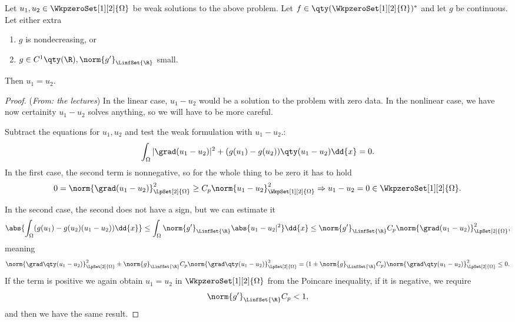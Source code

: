 \begin{example}
\begin{theorem}[Uniqueness]
	Let $u_1, u_2 \in \WkpzeroSet[1][2]{\Omega}$ be weak solutions to the above problem. Let $f \in \qty(\WkpzeroSet[1][2]{\Omega})^{*}$ and let $g$ be continuous. Let either extra 
	\begin{enumerate}
		\item $g$ is nondecreasing, or
		\item $g \in C^1\qty(\R), \norm{g'}_{\LinfSet{\R}}$ small.
	\end{enumerate}
	Then $u_1 = u_2$.
\end{theorem}
\begin{proof}(\textit{From: the lectures})
	In the linear case, $u_1 - u_2$ would be a solution to the problem with zero data. In the nonlinear case, we have now certainity $u_1 - u_2$ solves anything, so we will have to be more careful.
	
Subtract the equations for $u_1, u_2$ and test the weak formulation with $u_1 - u_2.$:
	\[
		\int_{\Omega}|\grad(u_1 - u_2)|^{2} + (g(u_1)-g(u_2))\qty(u_1-u_2)\dd{x} = 0.
	\]
	In the first case, the second term is nonnegative, so for the whole thing to be zero it has to hold 
	\[
		0=\norm{\grad(u_1 - u_2)}_{\LpSet[2]{\Omega}}^{2} \geq C_p \norm{u_1 - u_2}_{\WkpSet[1][2]{\Omega}}^{2} \Rightarrow u_1 - u_2 = 0 \in \WkpzeroSet[1][2]{\Omega}.
	\]

	In the second case, the second does not have a sign, but we can estimate it
	\[
		\abs{\int_{\Omega}(g(u_1)-g(u_2)(u_1-u_2))\dd{x}} \leq \int_{\Omega}\norm{g'}_{\LinfSet{\R}}\abs{u_1 - u_2|^{2}}\dd{x} \leq \norm{g'}_{\LinfSet{\R}} C_p \norm{\grad(u_1 - u_2)}_{\LpSet[2]{\Omega}}^{2}, 
	\]
	meaning
	\[
		\norm{\grad\qty(u_1 - u_2)}_{\LpSet[2]{\Omega}}^{2} \pm \norm{g}_{\LinfSet{\R}}C_p \norm{\grad\qty(u_1 - u_2)}_{\LpSet[2]{\Omega}}^{2}  = (1 \pm \norm{g}_{\LinfSet{\R}}C_p)\norm{\grad\qty(u_1 - u_2)}_{\LpSet[2]{\Omega}}^{2} \leq 0.
	\]
	If the term is positive we again obtain $u_1 = u_2$ in $\WkpzeroSet[1][2]{\Omega}$ from the Poincare inequality, if it is negative, we require
	\[
		\norm{g'}_{\LinfSet{\R}}C_p < 1,
	\]
	and then we have the same result.
\end{proof}
\end{example}

